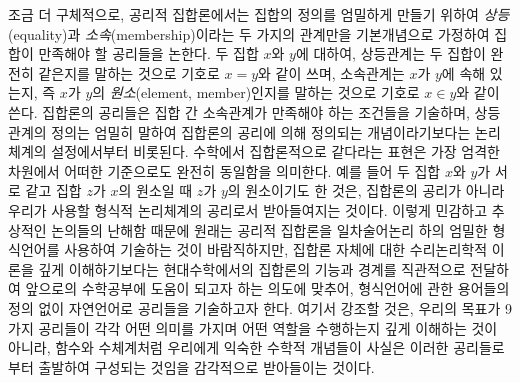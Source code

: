 \documentclass{../../large}
\begin{document}
조금 더 구체적으로, 공리적 집합론에서는 집합의 정의를 엄밀하게 만들기 위하여 \emph{상등}(equality)과 \emph{소속}(membership)이라는 두 가지의 관계만을 기본개념으로 가정하여 집합이 만족해야 할 공리들을 논한다.
두 집합 $x$와 $y$에 대하여, 상등관계는 두 집합이 완전히 같은지를 말하는 것으로 기호로 $x=y$와 같이 쓰며, 소속관계는 $x$가 $y$에 속해 있는지, 즉 $x$가 $y$의 \emph{원소}(element, member)인지를 말하는 것으로 기호로 $x\in y$와 같이 쓴다.
집합론의 공리들은 집합 간 소속관계가 만족해야 하는 조건들을 기술하며, 상등관계의 정의는 엄밀히 말하여 집합론의 공리에 의해 정의되는 개념이라기보다는 논리체계의 설정에서부터 비롯된다.
수학에서 집합론적으로 같다라는 표현은 가장 엄격한 차원에서 어떠한 기준으로도 완전히 동일함을 의미한다.
예를 들어 두 집합 $x$와 $y$가 서로 같고 집합 $z$가 $x$의 원소일 때 $z$가 $y$의 원소이기도 한 것은, 집합론의 공리가 아니라 우리가 사용할 형식적 논리체계의 공리로서 받아들여지는 것이다.
이렇게 민감하고 추상적인 논의들의 난해함 때문에 원래는 공리적 집합론을 일차술어논리 하의 엄밀한 형식언어를 사용하여 기술하는 것이 바람직하지만, 집합론 자체에 대한 수리논리학적 이론을 깊게 이해하기보다는 현대수학에서의 집합론의 기능과 경계를 직관적으로 전달하여 앞으로의 수학공부에 도움이 되고자 하는 의도에 맞추어, 형식언어에 관한 용어들의 정의 없이 자연언어로 공리들을 기술하고자 한다.
여기서 강조할 것은, 우리의 목표가 9가지 공리들이 각각 어떤 의미를 가지며 어떤 역할을 수행하는지 깊게 이해하는 것이 아니라, 함수와 수체계처럼 우리에게 익숙한 수학적 개념들이 사실은 이러한 공리들로부터 출발하여 구성되는 것임을 감각적으로 받아들이는 것이다.
\end{document}
